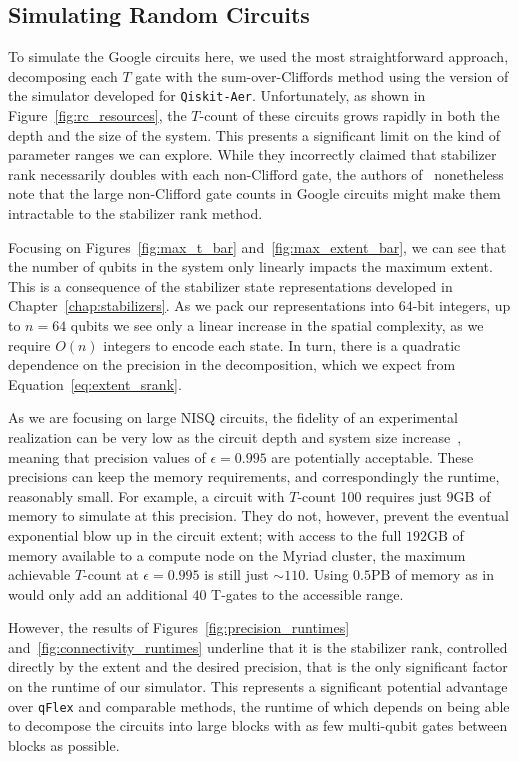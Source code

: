 \subsection{Simulating Random Circuits}
To simulate the Google circuits here, we used the most straightforward approach, decomposing each $T$ gate with the sum-over-Cliffords method using the version of the simulator developed for \texttt{Qiskit-Aer}. Unfortunately, as shown in Figure~\ref{fig:rc_resources}, the $T$-count of these circuits grows rapidly in both the depth and the size of the system. This presents a significant limit on the kind of parameter ranges we can explore. While they incorrectly claimed that stabilizer rank necessarily doubles with each non-Clifford gate, the authors of~\cite{Villalonga2019} nonetheless note that the large non-Clifford gate counts in Google circuits might make them intractable to the stabilizer rank method.\par
Focusing on Figures~\ref{fig:max_t_bar} and~\ref{fig:max_extent_bar}, we can see that the number of qubits in the system only linearly impacts the maximum extent. This is a consequence of the stabilizer state representations developed in Chapter~\ref{chap:stabilizers}. As we pack our representations into $64$-bit integers, up to $n=64$ qubits we see only a linear increase in the spatial complexity, as we require $O(n)$ integers to encode each state. In turn, there is a quadratic dependence on the precision in the decomposition, which we expect from Equation~\ref{eq:extent_srank}.\par
As we are focusing on large NISQ circuits, the fidelity of an experimental realization can be very low as the circuit depth and system size increase~\cite{Villalonga2019,Villalonga2018}, meaning that precision values of $\epsilon=0.995$ are potentially acceptable. These precisions can keep the memory requirements, and correspondingly the runtime, reasonably small. For example, a circuit with $T$-count 100 requires just $9\mathrm{GB}$ of memory to simulate at this precision. They do not, however, prevent the eventual exponential blow up in the circuit extent; with access to the full $192\mathrm{GB}$ of memory available to a compute node on the Myriad cluster, the maximum achievable $T$-count at $\epsilon=0.995$ is still just $\sim 110$. Using $0.5\mathrm{PB}$ of memory as in~\cite{Villalonga2019} would only add an additional $40$ T-gates to the accessible range.\par
However, the results of Figures~\ref{fig:precision_runtimes} and~\ref{fig:connectivity_runtimes} underline that it is the stabilizer rank, controlled directly by the extent and the desired precision, that is the only significant factor on the runtime of our simulator. This represents a significant potential advantage over \texttt{qFlex} and comparable methods, the runtime of which depends on being able to decompose the circuits into large blocks with as few multi-qubit gates between blocks as possible.\par
